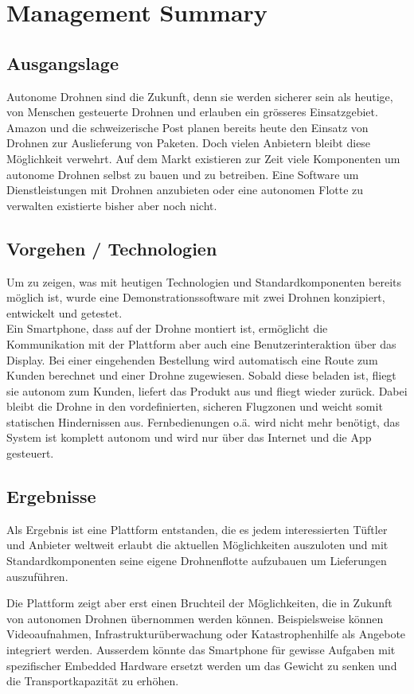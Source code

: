\newpage
{}
\chapter*{Management Summary}
\section*{Ausgangslage}
Autonome Drohnen sind die Zukunft, denn sie werden sicherer sein als heutige, von Menschen gesteuerte Drohnen und erlauben ein grösseres Einsatzgebiet. Amazon und die schweizerische Post planen bereits heute den Einsatz von Drohnen zur Auslieferung von Paketen. Doch vielen Anbietern bleibt diese Möglichkeit verwehrt. Auf dem Markt existieren zur Zeit viele Komponenten um autonome Drohnen selbst zu bauen und zu betreiben. Eine Software um Dienstleistungen mit Drohnen anzubieten oder eine autonomen Flotte zu verwalten existierte bisher aber noch nicht.

\section*{Vorgehen / Technologien}
Um zu zeigen, was mit heutigen Technologien und Standardkomponenten bereits möglich ist, wurde eine Demonstrationssoftware mit zwei Drohnen konzipiert, entwickelt und getestet.  \\

Ein Smartphone, dass auf der Drohne montiert ist, ermöglicht die Kommunikation mit der Plattform aber auch eine Benutzerinteraktion über das Display. Bei einer eingehenden Bestellung wird automatisch eine Route zum Kunden berechnet und einer Drohne zugewiesen. Sobald diese beladen ist, fliegt sie autonom zum Kunden, liefert das Produkt aus und fliegt wieder zurück. Dabei bleibt die Drohne in den vordefinierten, sicheren Flugzonen und weicht somit statischen Hindernissen aus. Fernbedienungen o.ä. wird nicht mehr benötigt, das System ist komplett autonom und wird nur über das Internet und die App gesteuert.

\section*{Ergebnisse}
Als Ergebnis ist eine Plattform entstanden, die es jedem interessierten Tüftler und Anbieter weltweit erlaubt die aktuellen Möglichkeiten auszuloten und mit Standardkomponenten seine eigene Drohnenflotte aufzubauen um Lieferungen auszuführen.

Die Plattform zeigt aber erst einen Bruchteil der Möglichkeiten, die in Zukunft von autonomen Drohnen übernommen werden können. Beispielsweise können Videoaufnahmen, Infrastrukturüberwachung oder Katastrophenhilfe als Angebote integriert werden. Ausserdem könnte das Smartphone für gewisse Aufgaben mit spezifischer Embedded Hardware ersetzt werden um das Gewicht zu senken und die Transportkapazität zu erhöhen. 